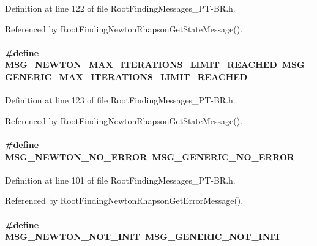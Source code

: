 Definition at line 122 of file RootFindingMessages\_\-PT-BR.h.

Referenced by RootFindingNewtonRhapsonGetStateMessage().\hypertarget{group____messages_g945597514c7386c4cf8501ed89dea0ec}{
\paragraph[MSG\_\-NEWTON\_\-MAX\_\-ITERATIONS\_\-LIMIT\_\-REACHED]{\setlength{\rightskip}{0pt plus 5cm}\#define MSG\_\-NEWTON\_\-MAX\_\-ITERATIONS\_\-LIMIT\_\-REACHED~MSG\_\-GENERIC\_\-MAX\_\-ITERATIONS\_\-LIMIT\_\-REACHED}\hfill}
\label{group____messages_g945597514c7386c4cf8501ed89dea0ec}




Definition at line 123 of file RootFindingMessages\_\-PT-BR.h.

Referenced by RootFindingNewtonRhapsonGetStateMessage().\hypertarget{group____messages_g40705a83db640354a9ed6bdd2ae0d83b}{
\paragraph[MSG\_\-NEWTON\_\-NO\_\-ERROR]{\setlength{\rightskip}{0pt plus 5cm}\#define MSG\_\-NEWTON\_\-NO\_\-ERROR~MSG\_\-GENERIC\_\-NO\_\-ERROR}\hfill}
\label{group____messages_g40705a83db640354a9ed6bdd2ae0d83b}




Definition at line 101 of file RootFindingMessages\_\-PT-BR.h.

Referenced by RootFindingNewtonRhapsonGetErrorMessage().\hypertarget{group____messages_ga1b4ab745166b225744424592a99ac26}{
\paragraph[MSG\_\-NEWTON\_\-NOT\_\-INIT]{\setlength{\rightskip}{0pt plus 5cm}\#define MSG\_\-NEWTON\_\-NOT\_\-INIT~MSG\_\-GENERIC\_\-NOT\_\-INIT}\hfill}
\label{group____messages_ga1b4ab745166b225744424592a99ac26}




